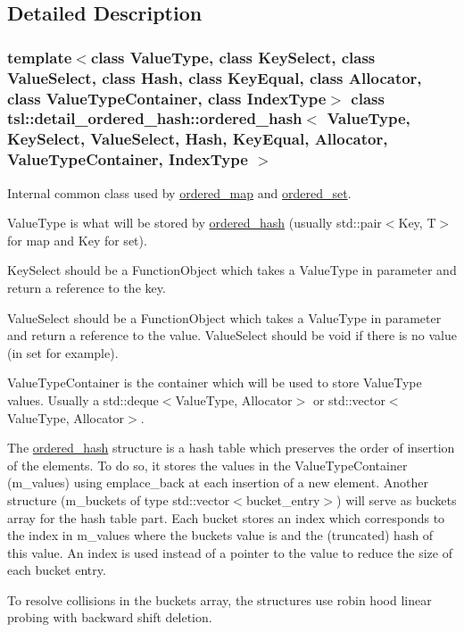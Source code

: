 \subsection{Detailed Description}
\subsubsection*{template$<$class Value\+Type, class Key\+Select, class Value\+Select, class Hash, class Key\+Equal, class Allocator, class Value\+Type\+Container, class Index\+Type$>$\newline
class tsl\+::detail\+\_\+ordered\+\_\+hash\+::ordered\+\_\+hash$<$ Value\+Type, Key\+Select, Value\+Select, Hash, Key\+Equal, Allocator, Value\+Type\+Container, Index\+Type $>$}

Internal common class used by \mbox{\hyperlink{classtsl_1_1ordered__map}{ordered\+\_\+map}} and \mbox{\hyperlink{classtsl_1_1ordered__set}{ordered\+\_\+set}}.

Value\+Type is what will be stored by \mbox{\hyperlink{classtsl_1_1detail__ordered__hash_1_1ordered__hash}{ordered\+\_\+hash}} (usually std\+::pair$<$\+Key, T$>$ for map and Key for set).

Key\+Select should be a Function\+Object which takes a Value\+Type in parameter and return a reference to the key.

Value\+Select should be a Function\+Object which takes a Value\+Type in parameter and return a reference to the value. Value\+Select should be void if there is no value (in set for example).

Value\+Type\+Container is the container which will be used to store Value\+Type values. Usually a std\+::deque$<$\+Value\+Type, Allocator$>$ or std\+::vector$<$\+Value\+Type, Allocator$>$.

The \mbox{\hyperlink{classtsl_1_1detail__ordered__hash_1_1ordered__hash}{ordered\+\_\+hash}} structure is a hash table which preserves the order of insertion of the elements. To do so, it stores the values in the Value\+Type\+Container (m\+\_\+values) using emplace\+\_\+back at each insertion of a new element. Another structure (m\+\_\+buckets of type std\+::vector$<$bucket\+\_\+entry$>$) will serve as buckets array for the hash table part. Each bucket stores an index which corresponds to the index in m\+\_\+values where the bucket\textquotesingle{}s value is and the (truncated) hash of this value. An index is used instead of a pointer to the value to reduce the size of each bucket entry.

To resolve collisions in the buckets array, the structures use robin hood linear probing with backward shift deletion. 

